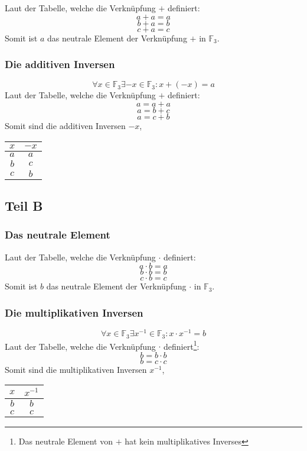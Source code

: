\documentclass[a4paper,tikz]{article}
\begin{document}
Laut der Tabelle, welche die Verknüpfung $+$ definiert:
\[a + a = a\]
\[b + a = b\]
\[c + a = c\]
Somit ist $a$ das neutrale Element der Verknüpfung $+$ in $\mathbb{F}_3$.


\subsubsection{Die additiven Inversen}

\[\forall x \in \mathbb{F}_3 \exists -x \in \mathbb{F}_3: x+(-x) = a\]
Laut der Tabelle, welche die Verknüpfung $+$ definiert:
\[a = a + a\]
\[a = b + c\]
\[a = c + b\]
Somit sind die additiven Inversen $-x$,
\begin{center}
\begin{tabular}{ c|c } 
 $x$ & $-x$ \\
 \hline
 $a$ & $a$ \\
 $b$ & $c$ \\
 $c$ & $b$ \\
\end{tabular}
\end{center}



\subsection{Teil B}
\subsubsection{Das neutrale Element}
Laut der Tabelle, welche die Verknüpfung $\cdot$ definiert:
\[a \cdot b = a\]
\[b \cdot b = b\]
\[c \cdot b = c\]
Somit ist $b$ das neutrale Element der Verknüpfung $\cdot$ in $\mathbb{F}_3$.

\subsubsection{Die multiplikativen Inversen}
\[\forall x \in \mathbb{F}_3 \exists x^{-1} \in \mathbb{F}_3 : x \cdot x^{-1} = b\]
Laut der Tabelle, welche die Verknüpfung $\cdot$ definiert\footnote{Das neutrale Element von $+$ hat kein multiplikatives Inverses}:
\[b = b \cdot b\]
\[b = c \cdot c\]
Somit sind die multiplikativen Inversen $x^{-1}$,
\begin{center}
\begin{tabular}{ c|c } 
 $x$ & $x^{-1}$ \\
 \hline
 $b$ & $b$ \\
 $c$ & $c$ \\
\end{tabular}
\end{center}
\end{document}
